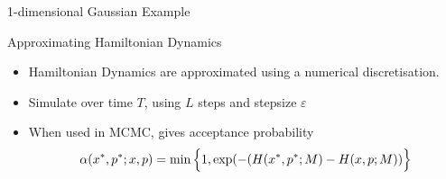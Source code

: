 \documentclass{beamer}
\begin{document}
\begin{frame}{1-dimensional Gaussian Example}
\begin{figure}
\centering
{}
\end{figure}
\end{frame}


\begin{frame}{Approximating Hamiltonian Dynamics}

\begin{itemize}
\item Hamiltonian Dynamics are approximated using a numerical discretisation. 

\item Simulate over time $T$, using $L$ steps and stepsize $\varepsilon$

\item When used in MCMC, gives acceptance probability $$ \alpha(x^{*}, p^{*} ;x, p) = \min \Big{\{} 1, \exp(-(H(x^{*}, p^{*};M) - H(x,p;M)) \Big{\}} $$

\end{itemize}

\end{frame}










\end{document}
